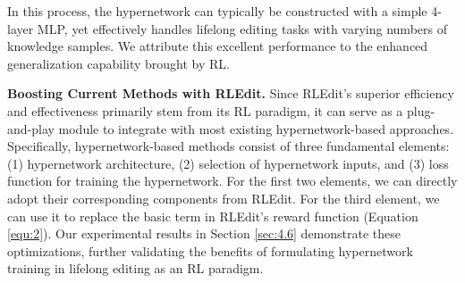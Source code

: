In this process, the hypernetwork can typically be constructed with a simple 4-layer MLP, yet effectively handles lifelong editing tasks with varying numbers of knowledge samples. We attribute this excellent performance to the enhanced generalization capability brought by RL.

\textbf{Boosting Current Methods with RLEdit.} Since RLEdit's superior efficiency and effectiveness primarily stem from its RL paradigm, it can serve as a plug-and-play module to integrate with most existing hypernetwork-based approaches. Specifically, hypernetwork-based methods consist of three fundamental elements: (1) hypernetwork architecture, (2) selection of hypernetwork inputs, and (3) loss function for training the hypernetwork. For the first two elements, we can directly adopt their corresponding components from RLEdit. For the third element, we can use it to replace the basic term in RLEdit's reward function (Equation \ref{equ:2}). Our experimental results in Section \ref{sec:4.6} demonstrate these optimizations, further validating the benefits of formulating hypernetwork training in lifelong editing as an RL paradigm.

